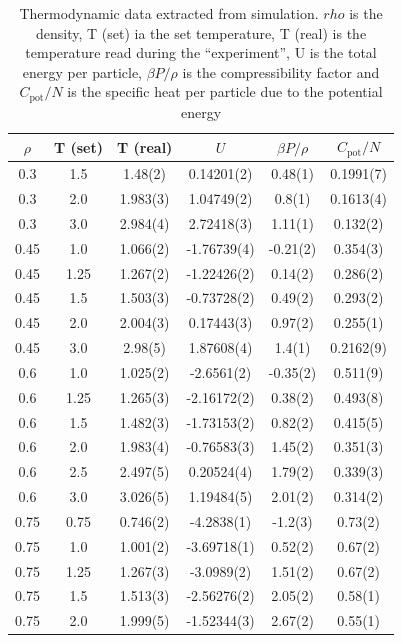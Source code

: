 \documentclass[aps,prl,reprint,groupedaddress]{revtex4-1}
\begin{document}
\begingroup
\squeezetable
\begin{table}[ht]%
\caption{Thermodynamic data extracted from simulation. $rho$ is the density, T (set) ia the set temperature, T (real) is the temperature read during the ``experiment'', U is the total energy per particle, $\beta P/\rho$ is the compressibility factor and $C_{\text{pot}}/N$ is the specific heat per particle due to the potential energy \label{thermo_data}}
\begin{ruledtabular}
\begin{tabular}{ c  c  c  c  c  c }
$\rho$ & T (set) & T (real) & $U$ & $\beta P/\rho$ & $C_{\text{pot}}/N$ \\ \hline
0.3 & 1.5 & 1.48(2) & 0.14201(2) & 0.48(1) & 0.1991(7) \\ 
0.3 & 2.0 & 1.983(3) & 1.04749(2) & 0.8(1) & 0.1613(4) \\ 
0.3 & 3.0 & 2.984(4) & 2.72418(3) & 1.11(1) & 0.132(2) \\ 
0.45 & 1.0 & 1.066(2) & -1.76739(4) & -0.21(2) & 0.354(3) \\ 
0.45 & 1.25 & 1.267(2) & -1.22426(2) & 0.14(2) & 0.286(2) \\ 
0.45 & 1.5 & 1.503(3) & -0.73728(2) & 0.49(2) & 0.293(2) \\ 
0.45 & 2.0 & 2.004(3) & 0.17443(3) & 0.97(2) & 0.255(1) \\ 
0.45 & 3.0 & 2.98(5) & 1.87608(4) & 1.4(1) & 0.2162(9) \\ 
0.6 & 1.0 & 1.025(2) & -2.6561(2) & -0.35(2) & 0.511(9) \\ 
0.6 & 1.25 & 1.265(3) & -2.16172(2) & 0.38(2) & 0.493(8) \\ 
0.6 & 1.5 & 1.482(3) & -1.73153(2) & 0.82(2) & 0.415(5) \\ 
0.6 & 2.0 & 1.983(4) & -0.76583(3) & 1.45(2) & 0.351(3) \\ 
0.6 & 2.5 & 2.497(5) & 0.20524(4) & 1.79(2) & 0.339(3) \\ 
0.6 & 3.0 & 3.026(5) & 1.19484(5) & 2.01(2) & 0.314(2) \\ 
0.75 & 0.75 & 0.746(2) & -4.2838(1) & -1.2(3) & 0.73(2) \\ 
0.75 & 1.0 & 1.001(2) & -3.69718(1) & 0.52(2) & 0.67(2) \\ 
0.75 & 1.25 & 1.267(3) & -3.0989(2) & 1.51(2) & 0.67(2) \\ 
0.75 & 1.5 & 1.513(3) & -2.56276(2) & 2.05(2) & 0.58(1) \\ 
0.75 & 2.0 & 1.999(5) & -1.52344(3) & 2.67(2) & 0.55(1) \\ 

\end{tabular}
\end{ruledtabular}
\end{table}
\end{document}
